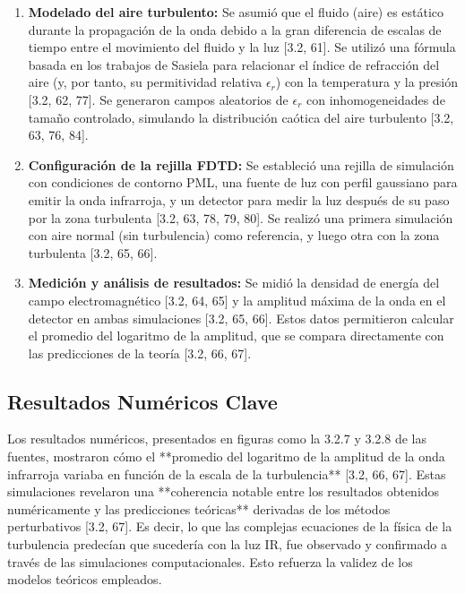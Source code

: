 \begin{enumerate}[noitemsep,topsep=0pt] 

    \item \textbf{Modelado del aire turbulento:} Se asumió que el fluido (aire) es estático durante la propagación de la onda debido a la gran diferencia de escalas de tiempo entre el movimiento del fluido y la luz [3.2, 61]. Se utilizó una fórmula basada en los trabajos de Sasiela para relacionar el índice de refracción del aire (y, por tanto, su permitividad relativa $\epsilon_r$) con la temperatura y la presión [3.2, 62, 77]. Se generaron campos aleatorios de $\epsilon_r$ con inhomogeneidades de tamaño controlado, simulando la distribución caótica del aire turbulento [3.2, 63, 76, 84]. 
    \item \textbf{Configuración de la rejilla FDTD:} Se estableció una rejilla de simulación con condiciones de contorno PML, una fuente de luz con perfil gaussiano para emitir la onda infrarroja, y un detector para medir la luz después de su paso por la zona turbulenta [3.2, 63, 78, 79, 80]. Se realizó una primera simulación con aire normal (sin turbulencia) como referencia, y luego otra con la zona turbulenta [3.2, 65, 66]. 
    \item \textbf{Medición y análisis de resultados:} Se midió la densidad de energía del campo electromagnético [3.2, 64, 65] y la amplitud máxima de la onda en el detector en ambas simulaciones [3.2, 65, 66]. Estos datos permitieron calcular el promedio del logaritmo de la amplitud, que se compara directamente con las predicciones de la teoría [3.2, 66, 67].
\end{enumerate} 

\subsection{Resultados Numéricos Clave} Los resultados numéricos, presentados en figuras como la 3.2.7 y 3.2.8 de las fuentes, mostraron cómo el **promedio del logaritmo de la amplitud de la onda infrarroja variaba en función de la escala de la turbulencia** [3.2, 66, 67]. Estas simulaciones revelaron una **coherencia notable entre los resultados obtenidos numéricamente y las predicciones teóricas** derivadas de los métodos perturbativos [3.2, 67]. Es decir, lo que las complejas ecuaciones de la física de la turbulencia predecían que sucedería con la luz IR, fue observado y confirmado a través de las simulaciones computacionales. Esto refuerza la validez de los modelos teóricos empleados. 

